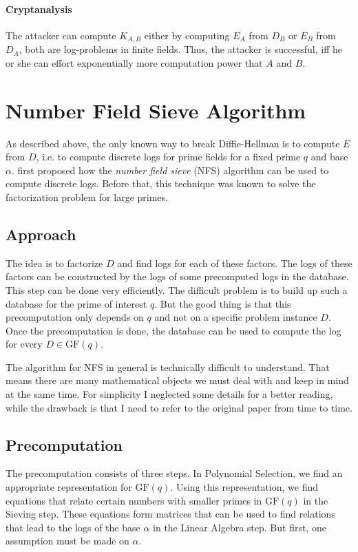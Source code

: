 \documentclass[paper=a4, fontsize=11pt]{scrartcl} %
\numberwithin{equation}{section} %
\numberwithin{figure}{section} %
\numberwithin{table}{section} %
\begin{document}
\paragraph{Cryptanalysis}
The attacker can compute $K_{A,B}$ either by computing $E_A$ from $D_B$ or $E_B$ from $D_A$, both are log-problems in finite fields. Thus, the attacker is successful, iff he or she can effort exponentially more computation power that $A$ and $B$.

\section{Number Field Sieve Algorithm}
As described above, the only known way to break Diffie-Hellman is to compute $E$ from $D$, i.e. to compute discrete logs for prime fields for a fixed prime $q$ and base $\alpha$. \citep{gordon1993discrete} first proposed how the \textit{number field sieve} (NFS) algorithm can be used to compute discrete logs. Before that, this technique was known to solve the factorization problem for large primes.

\subsection{Approach}
The idea is to factorize $D$ and find logs for each of these factors. The logs of these factors can be constructed by the logs of some precomputed logs in the database. This step can be done very efficiently. The difficult problem is to build up such a database for the prime of interest $q$. But the good thing is that this precomputation only depends on $q$ and not on a specific problem instance $D$. Once the precomputation is done, the database can be used to compute the log for every $D\in \mathrm{GF}(q)$.

The algorithm for NFS in general is technically difficult to understand. That means there are many mathematical objects we must deal with and keep in mind at the same time. For simplicity I neglected some details for a better reading, while the drawback is that I need to refer to the original paper from time to time.

\subsection{Precomputation}
The precomputation consists of three steps. In Polynomial Selection, we find an appropriate representation for $\mathrm{GF}(q)$. Using this representation, we find equations that relate certain numbers with smaller primes in $\mathrm{GF}(q)$ in the Sieving step. These equations form matrices that can be used to find relations that lead to the logs of the base $\alpha$ in the Linear Algebra step. But first, one assumption must be made on $\alpha$.
\end{document}
